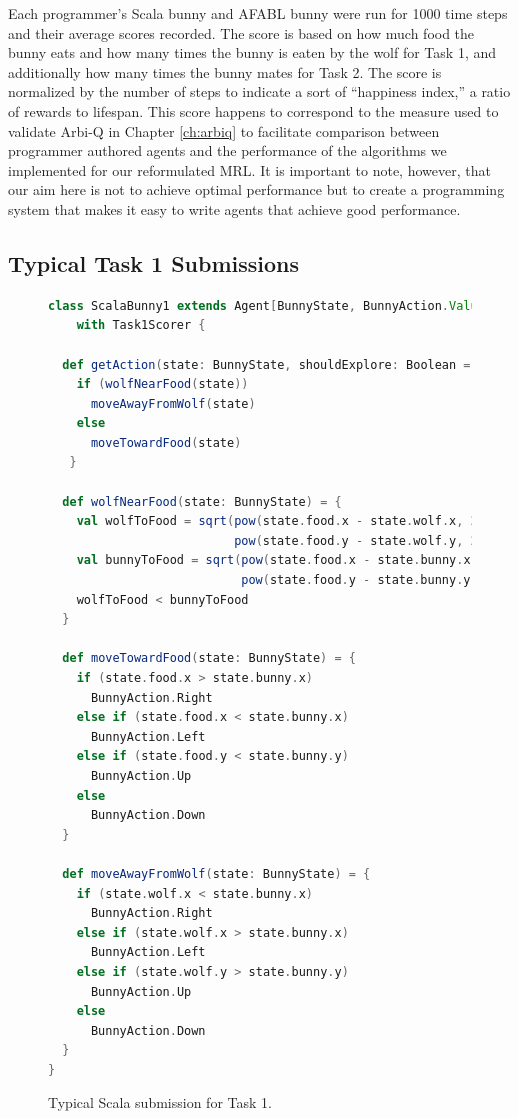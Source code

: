 Each programmer's Scala bunny and AFABL bunny were run for 1000 time steps and their average scores recorded. The score is based on how much food the bunny eats and how many times the bunny is eaten by the wolf for Task 1, and additionally how many times the bunny mates for Task 2. The score is normalized by the number of steps to indicate a sort of ``happiness index,'' a ratio of rewards to lifespan. This score happens to correspond to the measure used to validate Arbi-Q in Chapter \ref{ch:arbiq} to facilitate comparison between programmer authored agents and the performance of the algorithms we implemented for our reformulated MRL. It is important to note, however, that our aim here is not to achieve optimal performance but to create a programming system that makes it easy to write agents that achieve good performance.

\subsection{Typical Task 1 Submissions}

\begin{figure}[!h]
\begin{center}

\begin{lstlisting}[language=Scala]
class ScalaBunny1 extends Agent[BunnyState, BunnyAction.Value]
    with Task1Scorer {

  def getAction(state: BunnyState, shouldExplore: Boolean = false) = {
    if (wolfNearFood(state))
      moveAwayFromWolf(state)
    else
      moveTowardFood(state)
   }

  def wolfNearFood(state: BunnyState) = {
    val wolfToFood = sqrt(pow(state.food.x - state.wolf.x, 2) +
                          pow(state.food.y - state.wolf.y, 2))
    val bunnyToFood = sqrt(pow(state.food.x - state.bunny.x, 2) +
                           pow(state.food.y - state.bunny.y, 2))
    wolfToFood < bunnyToFood
  }

  def moveTowardFood(state: BunnyState) = {
    if (state.food.x > state.bunny.x)
      BunnyAction.Right
    else if (state.food.x < state.bunny.x)
      BunnyAction.Left
    else if (state.food.y < state.bunny.y)
      BunnyAction.Up
    else
      BunnyAction.Down
  }

  def moveAwayFromWolf(state: BunnyState) = {
    if (state.wolf.x < state.bunny.x)
      BunnyAction.Right
    else if (state.wolf.x > state.bunny.x)
      BunnyAction.Left
    else if (state.wolf.y > state.bunny.y)
      BunnyAction.Up
    else
      BunnyAction.Down
  }
}
\end{lstlisting}

\caption{Typical Scala submission for Task 1.}
\end{center}
\label{fig:scala-task1-submission}
\end{figure}

